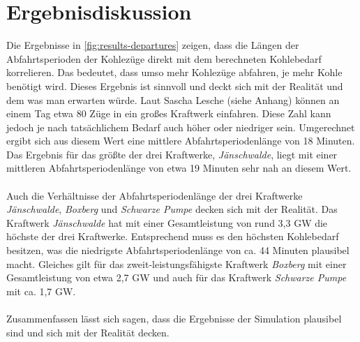 \section{Ergebnisdiskussion}

Die Ergebnisse in \autoref{fig:results-departures} zeigen, dass die Längen der Abfahrtsperioden der Kohlezüge direkt mit dem berechneten Kohlebedarf korrelieren. Das bedeutet, dass umso mehr Kohlezüge abfahren, je mehr Kohle benötigt wird. Dieses Ergebnis ist sinnvoll und deckt sich mit der Realität und dem was man erwarten würde. Laut Sascha Lesche (siehe Anhang) können an einem Tag etwa 80 Züge in ein großes Kraftwerk einfahren. Diese Zahl kann jedoch je nach tatsächlichem Bedarf auch höher oder niedriger sein. Umgerechnet ergibt sich aus diesem Wert eine mittlere Abfahrtsperiodenlänge von 18 Minuten. Das Ergebnis für das größte der drei Kraftwerke, \emph{Jänschwalde}, liegt mit einer mittleren Abfahrtsperiodenlänge von etwa 19 Minuten sehr nah an diesem Wert. \\
\\
Auch die Verhältnisse der Abfahrtsperiodenlänge der drei Kraftwerke \emph{Jänschwalde}, \emph{Boxberg} und \emph{Schwarze Pumpe} decken sich mit der Realität. Das Kraftwerk \emph{Jänschwalde} hat mit einer Gesamtleistung von rund 3,3 GW die höchste der drei Kraftwerke. Entsprechend muss es den höchsten Kohlebedarf besitzen, was die niedrigste Abfahrtsperiodenlänge von ca. 44 Minuten plausibel macht. Gleiches gilt für das zweit-leistungsfähigste Kraftwerk \emph{Boxberg} mit einer Gesamtleistung von etwa 2,7 GW und auch für das Kraftwerk \emph{Schwarze Pumpe} mit ca. 1,7 GW. \cite{noauthor_bundesnetzagentur_nodate}\\
\\
Zusammenfassen lässt sich sagen, dass die Ergebnisse der Simulation plausibel sind und sich mit der Realität decken.